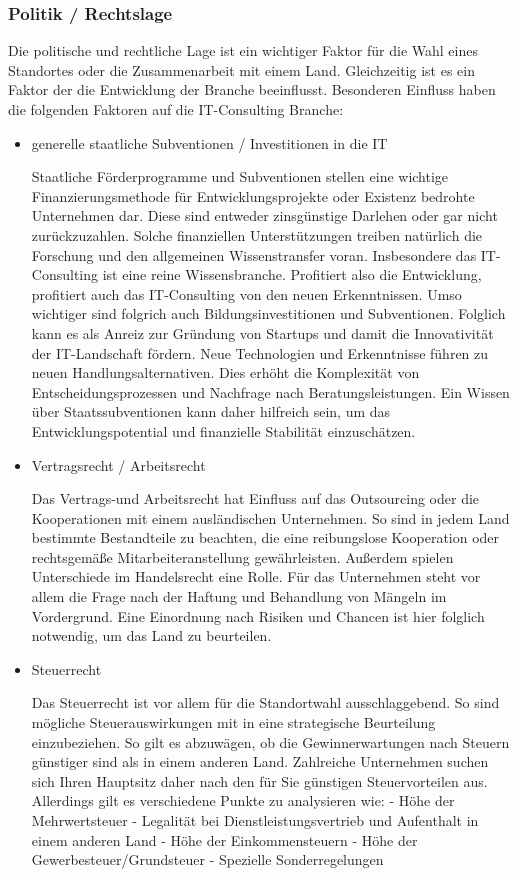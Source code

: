  \subsubsection{Politik / Rechtslage}
Die politische und rechtliche Lage ist ein wichtiger Faktor für die Wahl eines Standortes oder die Zusammenarbeit mit einem Land. Gleichzeitig ist es ein Faktor der die Entwicklung der Branche beeinflusst.
Besonderen Einfluss haben die folgenden Faktoren auf die IT-Consulting Branche:
\begin{itemize} 
\item {generelle staatliche Subventionen / Investitionen in die IT}

 Staatliche Förderprogramme und Subventionen stellen eine wichtige Finanzierungsmethode für Entwicklungsprojekte oder Existenz bedrohte Unternehmen dar. Diese sind entweder zinsgünstige Darlehen oder gar nicht zurückzuzahlen.
 Solche finanziellen Unterstützungen treiben natürlich die Forschung und den allgemeinen Wissenstransfer voran. Insbesondere das IT-Consulting ist eine reine Wissensbranche. Profitiert also die Entwicklung, profitiert auch das IT-Consulting von den neuen Erkenntnissen. 
 Umso wichtiger sind folgrich auch Bildungsinvestitionen und Subventionen. Folglich kann es als Anreiz zur Gründung von Startups und damit die Innovativität der IT-Landschaft fördern. Neue Technologien und Erkenntnisse führen zu neuen Handlungsalternativen. Dies erhöht die Komplexität von Entscheidungsprozessen und Nachfrage nach Beratungsleistungen.
Ein Wissen über Staatssubventionen kann daher hilfreich sein, um das Entwicklungspotential und finanzielle Stabilität einzuschätzen.

\item  {Vertragsrecht / Arbeitsrecht}

 Das Vertrags-und Arbeitsrecht hat Einfluss auf das Outsourcing oder die Kooperationen mit einem ausländischen Unternehmen. 
 So sind in jedem Land bestimmte Bestandteile zu beachten, die eine reibungslose Kooperation oder rechtsgemäße Mitarbeiteranstellung gewährleisten. Außerdem spielen Unterschiede im Handelsrecht eine Rolle. 
Für das Unternehmen steht vor allem die Frage nach der Haftung und Behandlung von Mängeln im Vordergrund. 
Eine Einordnung nach Risiken und Chancen ist hier folglich notwendig, um das Land zu beurteilen. 

\item {Steuerrecht}

 Das Steuerrecht ist vor allem für die Standortwahl ausschlaggebend. 
 So sind mögliche Steuerauswirkungen mit in eine strategische Beurteilung  einzubeziehen. So gilt es abzuwägen, ob die Gewinnerwartungen nach Steuern günstiger sind als in einem anderen Land. Zahlreiche Unternehmen suchen sich Ihren Hauptsitz daher nach den für Sie günstigen Steuervorteilen aus.
 Allerdings gilt es verschiedene Punkte zu analysieren wie:
 - Höhe der Mehrwertsteuer
 - Legalität bei Dienstleistungsvertrieb und Aufenthalt in einem anderen Land
 - Höhe der Einkommensteuern
 - Höhe der Gewerbesteuer/Grundsteuer
 - Spezielle Sonderregelungen
 

\end{itemize}
